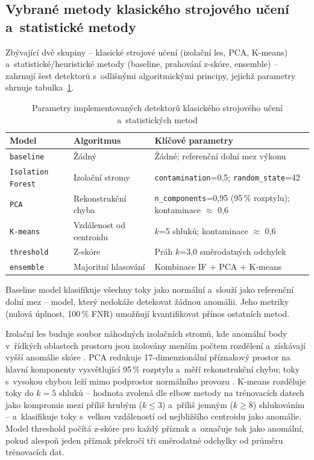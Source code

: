 \subsection{Vybrané metody klasického strojového učení a~statistické metody}
\label{sec:tradicni-algoritmy}

Zbývající dvě skupiny -- klasické strojové učení (izolační les, PCA, K-means) a~statistické/heuristické metody (baseline, prahování z-skóre, ensemble) -- zahrnují šest detektorů s~odlišnými algoritmickými principy, jejichž parametry shrnuje tabulka~\ref{tab:trad-models}.

\begin{table}[htbp]
\centering
\caption{Parametry implementovaných detektorů klasického strojového učení a~statistických metod}
\label{tab:trad-models}
\small
\begin{tabular}{llp{7cm}}
\toprule
Model & Algoritmus & Klíčové parametry \\
\midrule
\texttt{baseline} & Žádný & Žádné; referenční dolní mez výkonu \\
\texttt{Isolation Forest} & Izolační stromy & \texttt{contamination}=0{,}5; \texttt{random\_state}=42 \\
\texttt{PCA} & Rekonstrukční chyba & \texttt{n\_components}=0{,}95 (95\,\% rozptylu); kontaminace $\approx$ 0{,}6 \\
\texttt{K-means} & Vzdálenost od centroidu & $k$=5 shluků; kontaminace $\approx$ 0{,}6 \\
\texttt{threshold} & Z-skóre & Práh $k$=3{,}0 směrodatných odchylek \\
\texttt{ensemble} & Majoritní hlasování & Kombinace IF + PCA + K-means \\
\bottomrule
\end{tabular}
\end{table}

Baseline model klasifikuje všechny toky jako normální a~slouží jako referenční dolní mez -- model, který nedokáže detekovat žádnou anomálii. Jeho metriky (nulová úplnost, 100\,\% FNR) umožňují kvantifikovat přínos ostatních metod.

Izolační les buduje soubor náhodných izolačních stromů, kde anomální body v~řídkých oblastech prostoru jsou izolovány menším počtem rozdělení a~získávají vyšší anomálie skóre \parencite{Liu2008}. PCA redukuje 17-dimenzionální příznakový prostor na hlavní komponenty vysvětlující 95\,\% rozptylu a~měří rekonstrukční chybu; toky s~vysokou chybou leží mimo podprostor normálního provozu \parencite{Chapagain2022}. K-means rozděluje toky do $k = 5$ shluků -- hodnota zvolená dle elbow metody na trénovacích datech jako kompromis mezi příliš hrubým ($k \le 3$) a~příliš jemným ($k \ge 8$) shlukováním -- a~klasifikuje toky s~velkou vzdáleností od nejbližšího centroidu jako anomálie. Model threshold počítá z-skóre pro každý příznak a~označuje tok jako anomální, pokud alespoň jeden příznak překročí tři směrodatné odchylky od průměru trénovacích dat.

